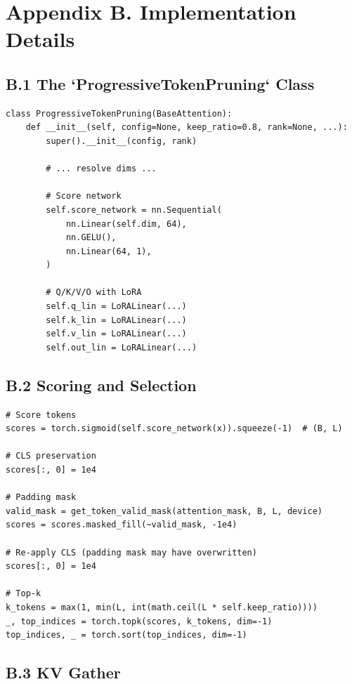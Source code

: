 {\section{Appendix B. Implementation Details}

\subsection{B.1 The `ProgressiveTokenPruning` Class}

\begin{lstlisting}
class ProgressiveTokenPruning(BaseAttention):
    def __init__(self, config=None, keep_ratio=0.8, rank=None, ...):
        super().__init__(config, rank)
        
        # ... resolve dims ...
        
        # Score network
        self.score_network = nn.Sequential(
            nn.Linear(self.dim, 64),
            nn.GELU(),
            nn.Linear(64, 1),
        )
        
        # Q/K/V/O with LoRA
        self.q_lin = LoRALinear(...)
        self.k_lin = LoRALinear(...)
        self.v_lin = LoRALinear(...)
        self.out_lin = LoRALinear(...)
\end{lstlisting}

\subsection{B.2 Scoring and Selection}

\begin{lstlisting}
# Score tokens
scores = torch.sigmoid(self.score_network(x)).squeeze(-1)  # (B, L)

# CLS preservation
scores[:, 0] = 1e4

# Padding mask
valid_mask = get_token_valid_mask(attention_mask, B, L, device)
scores = scores.masked_fill(~valid_mask, -1e4)

# Re-apply CLS (padding mask may have overwritten)
scores[:, 0] = 1e4

# Top-k
k_tokens = max(1, min(L, int(math.ceil(L * self.keep_ratio))))
_, top_indices = torch.topk(scores, k_tokens, dim=-1)
top_indices, _ = torch.sort(top_indices, dim=-1)
\end{lstlisting}

\subsection{B.3 KV Gather}

}
